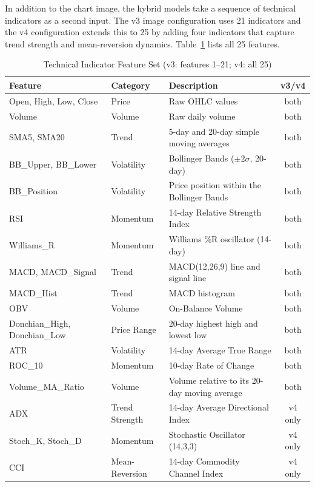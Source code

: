 In addition to the chart image, the hybrid models take a sequence of technical indicators as a second input. The v3 image configuration uses 21 indicators and the v4 configuration extends this to 25 by adding four indicators that capture trend strength and mean-reversion dynamics. Table~\ref{tab:features} lists all 25 features.

\begin{table}[H]
\centering
\caption{Technical Indicator Feature Set (v3: features 1--21; v4: all 25)}
\label{tab:features}
\small
\begin{tabular}{lllc}
\toprule
\textbf{Feature} & \textbf{Category} & \textbf{Description} & \textbf{v3/v4} \\
\midrule
Open, High, Low, Close & Price & Raw OHLC values & both \\
Volume & Volume & Raw daily volume & both \\
SMA5, SMA20 & Trend & 5-day and 20-day simple moving averages & both \\
BB\_Upper, BB\_Lower & Volatility & Bollinger Bands ($\pm 2\sigma$, 20-day) & both \\
BB\_Position & Volatility & Price position within the Bollinger Bands & both \\
RSI & Momentum & 14-day Relative Strength Index & both \\
Williams\_R & Momentum & Williams \%R oscillator (14-day) & both \\
MACD, MACD\_Signal & Trend & MACD(12,26,9) line and signal line & both \\
MACD\_Hist & Trend & MACD histogram & both \\
OBV & Volume & On-Balance Volume & both \\
Donchian\_High, Donchian\_Low & Price Range & 20-day highest high and lowest low & both \\
ATR & Volatility & 14-day Average True Range & both \\
ROC\_10 & Momentum & 10-day Rate of Change & both \\
Volume\_MA\_Ratio & Volume & Volume relative to its 20-day moving average & both \\
ADX & Trend Strength & 14-day Average Directional Index & v4 only \\
Stoch\_K, Stoch\_D & Momentum & Stochastic Oscillator (14,3,3) & v4 only \\
CCI & Mean-Reversion & 14-day Commodity Channel Index & v4 only \\
\bottomrule
\end{tabular}
\end{table}

